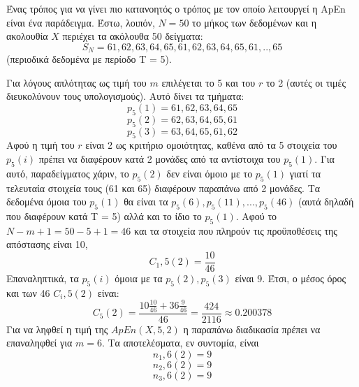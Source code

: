 \par
Ένας τρόπος για να γίνει πιο κατανοητός ο τρόπος με τον οποίο λειτουργεί η \en ApEn \gr είναι ένα παράδειγμα. Έστω, λοιπόν, $ N = 50$ το μήκος των δεδομένων και η ακολουθία $Χ$ περιέχει τα ακόλουθα 50 δείγματα:
\begin{equation}
	S_N = {61, 62, 63, 64, 65, 61, 62, 63, 64, 65, 61, .., 65}
\end{equation}
(περιοδικά δεδομένα με περίοδο Τ = 5). 
\par
Για λόγους απλότητας ως τιμή του $m$ επιλέγεται το 5 και του $r$ το 2 (αυτές οι τιμές διευκολύνουν τους υπολογισμούς). Αυτό δίνει τα τμήματα:
\begin{equation}
	p_5 (1) = {61, 62, 63, 64, 65}
\end{equation}
\begin{equation}
	p_5 (2) = {62, 63, 64, 65, 61}
\end{equation}
\begin{equation}
	p_5 (3) = {63, 64, 65, 61, 62}
\end{equation}
Αφού η τιμή του $r$ είναι 2 ως κριτήριο ομοιότητας, καθένα από τα 5 στοιχεία του $p_5(i)$ πρέπει να διαφέρουν κατά 2 μονάδες από τα αντίστοιχα του $p_5(1)$. Για αυτό, παραδείγματος χάριν, το $p_5(2)$ δεν είναι όμοιο με το $p_5(1)$ γιατί τα τελευταία στοιχεία τους (61 και 65) διαφέρουν παραπάνω από 2 μονάδες. Τα δεδομένα όμοια του $p_5(1)$ θα είναι τα $p_5(6), p_5(11), . . . , p_5(46)$ (αυτά δηλαδή που διαφέρουν κατά Τ = 5) αλλά και το ίδιο το $p_5(1)$. Αφού το $ N - m + 1 = 50 - 5 + 1 = 46$ και τα στοιχεία που πληρούν τις προϋποθέσεις της απόστασης είναι 10,
\begin{equation}
	C_1,5 (2) = \frac{10}{46}
\end{equation}
Επαναληπτικά, τα $p_5(i)$ όμοια με τα $p_5(2), p_5(3)$ είναι 9. Έτσι, ο μέσος όρος και των 46 $C_i,5 (2)$ είναι:
\begin{equation}
	C_5 (2) = \frac{10\frac{10}{46} + 36\frac{9}{46}}{46} = \frac{424}{2116} \approx 0.200378
\end{equation}
Για να ληφθεί η τιμή της $ApEn(X, 5, 2)$ η παραπάνω διαδικασία πρέπει να επαναληφθεί για $m = 6$. Τα αποτελέσματα, εν συντομία, είναι
\begin{equation}
	n_1,6 (2) = 9
\end{equation}
\begin{equation}
	n_2,6 (2) = 9
\end{equation}
\begin{equation}
	n_3,6 (2) = 9
\end{equation}
